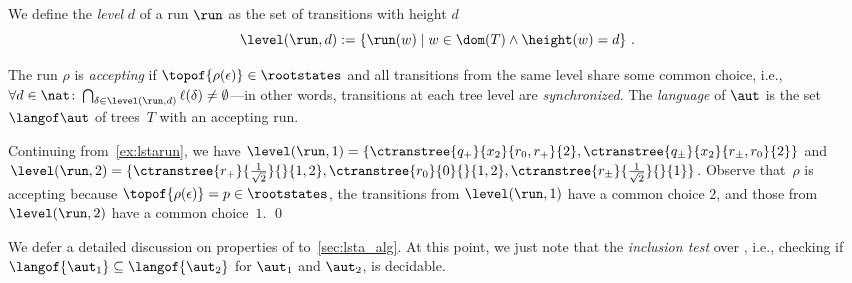 We define the \emph{level} $d$ of a run $\run$ as the set of transitions with height $d$
$$ \level(\run,d):= \{\run(w) \mid  w \in \dom(T) \land \height(w)=d\}\ .$$

The run $\rho$ is \emph{accepting} if $\topof{\rho(\epsilon)}\in\rootstates$ and
all transitions from the same level share some common choice, i.e., $\forall
d\in \nat\colon\bigcap_{\delta\in\level(\run,d)}\ell(\delta)\neq\emptyset$---in other words, transitions at each tree level are \emph{synchronized}.
The \emph{language} of $\aut$ is the set $\langof \aut$ of trees~$T$ with an accepting run.

\begin{example}
 Continuing from~\cref{ex:lstarun}, we have $\level(\run,1) = \{\ctranstree
  {q_{+}} {x_2} {r_{0}, r_{+}}{2}, \ctranstree {q_{\pm}} {x_2} {r_{\pm},
  r_{0}}{2}\}$ and $\level(\run,2)=\{\ctranstree {r_{+}} {\frac{1}{\sqrt{2}}}
  {}{1,2}, \ctranstree {r_0} {0} {}{1,2}, \ctranstree {r_{\pm}}
  {\frac{1}{\sqrt{2}}} {}{1}\}$. Observe that~$\rho$ is accepting because $\topof{\rho(\epsilon)}=p \in \rootstates$, the transitions from $\level(\run,1)$ have a common choice $2$, and those from $\level(\run,2)$ have a common choice~$1$.
  \qed
\end{example}

We defer a detailed discussion on properties of \lstas to~\cref{sec:lsta_alg}. 
At this point, we just note that the
\emph{inclusion test} over \lstas, i.e., checking if $\langof{\aut_1}\subseteq
\langof{\aut_2}$ for \lstas $\aut_1$ and $\aut_2$, is decidable.


